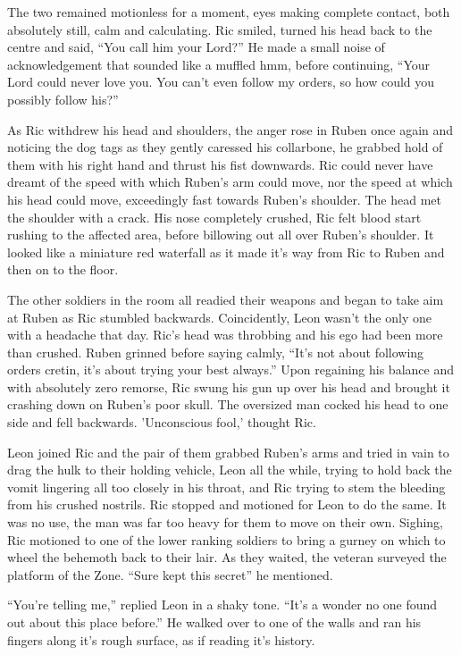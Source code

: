 The two remained motionless for a moment, eyes making complete contact, both absolutely still, calm and calculating.  Ric smiled, turned his head back to the centre and said, ``You call him your Lord?''  He made a small noise of acknowledgement that sounded like a muffled hmm, before continuing, ``Your Lord could never love you.  You can't even follow my orders, so how could you possibly follow his?''

As Ric withdrew his head and shoulders, the anger rose in Ruben once again and noticing the dog tags as they gently caressed his collarbone, he grabbed hold of them with his right hand and thrust his fist downwards.  Ric could never have dreamt of the speed with which Ruben's arm could move, nor the speed at which his head could move, exceedingly fast towards Ruben's shoulder.  The head met the shoulder with a crack.  His nose completely crushed, Ric felt blood start rushing to the affected area, before billowing out all over Ruben's shoulder.  It looked like a miniature red waterfall as it made it's way from Ric to Ruben and then on to the floor.

The other soldiers in the room all readied their weapons and began to take aim at Ruben as Ric stumbled backwards.  Coincidently, Leon wasn't the only one with a headache that day.  Ric's head was throbbing and his ego had been more than crushed.  Ruben grinned before saying calmly, ``It's not about following orders cretin, it's about trying your best always.''  Upon regaining his balance and with absolutely zero remorse, Ric swung his gun up over his head and brought it crashing down on Ruben's poor skull.  The oversized man cocked his head to one side and fell backwards.  'Unconscious fool,' thought Ric.  

Leon joined Ric and the pair of them grabbed Ruben's arms and tried in vain to drag the hulk to their holding vehicle, Leon all the while, trying to hold back the vomit lingering all too closely in his throat, and Ric trying to stem the bleeding from his crushed nostrils.  Ric stopped and motioned for Leon to do the same.  It was no use, the man was far too heavy for them to move on their own.  Sighing, Ric motioned to one of the lower ranking soldiers to bring a gurney on which to wheel the behemoth back to their lair.  As they waited, the veteran surveyed the platform of the Zone.  ``Sure kept this secret'' he mentioned.  

``You're telling me,'' replied Leon in a shaky tone.  ``It's a wonder no one found out about this place before.''  He walked over to one of the walls and ran his fingers along it's rough surface, as if reading it's history.  

